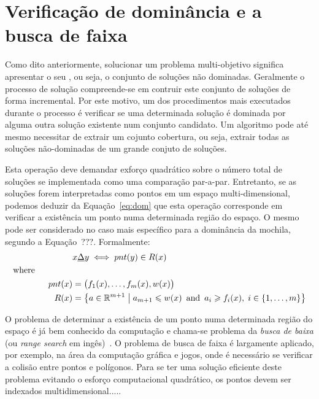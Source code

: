 

\section{Verificação de dominância e a busca de faixa}

Como dito anteriormente, solucionar um problema multi-objetivo significa
apresentar o seu \paretoset{}, ou seja, o conjunto de soluções não dominadas.
Geralmente o processo de solução compreende-se em contruir este conjunto de
soluções de forma incremental.
Por este motivo, um dos procedimentos mais executados durante o processo é
verificar se uma determinada solução é dominada por alguma outra solução
existente num conjunto candidato.
Um algoritmo pode até mesmo necessitar de extrair um cojunto cobertura, ou seja,
extrair todas as soluções não-dominadas de um grande conjuto de soluções.

Esta operação deve demandar exforço quadrático sobre o número total de soluções
se implementada como uma comparação par-a-par.
Entretanto, se as soluções forem interpretadas como pontos em um espaço
multi-dimensional, podemos deduzir da Equação~\ref{eq:dom} que esta operação
corresponde em verificar a existência um ponto numa determinada região
do espaço. O mesmo pode ser considerado no caso mais específico para a dominância
da mochila, segundo a Equação~???.
Formalmente:
\begin{align*}
    & x \underline{\Delta} y \; \Longleftrightarrow \; pnt(y) \in R(x) \\
  \text{where} \phantom{mmmmm} \\
    pnt(x) &= \big(f_{1}(x), \ldots, f_{m}(x), w(x)\big) \\
    R(x) &= \left\{ a \in \mathbb{R}^{m+1} \;\middle|\;
      a_{m+1} \leqslant w(x)
      \, \text{ and } \,
      a_i \geqslant f_{i}(x), \; i \in \{1, \ldots, m\}
      \right\}
\end{align*}


O problema de determinar a existência de um ponto numa determinada região do
espaço é já bem conhecido da computação e chama-se problema da
\emph{busca de baixa} (ou \emph{range search} em ingês)~\cite{agarwal1999geometric}.
O problema de busca de faixa é largamente aplicado, por exemplo, na área da
computação gráfica e jogos, onde é necessário se verificar a colisão entre pontos e polígonos.
Para se ter uma solução eficiente deste problema evitando o esforço computacional
quadrático, os pontos devem ser indexados multidimensional.....

